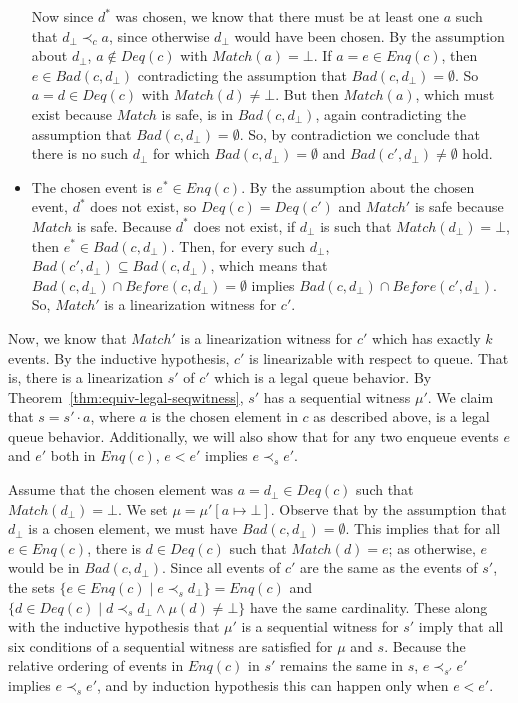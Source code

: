 \documentclass{LMCS}
\newcommand{\Match}{\ensuremath{\mathit{Match}}}
\newcommand{\Deq}[1]{\ensuremath{\mathit{Deq}({#1})}}
\newcommand{\Enq}[1]{\ensuremath{\mathit{Enq}({#1})}}
\newcommand{\Before}[2]{\ensuremath{\mathit{Before}({#1},{#2})}}
\newcommand{\Bad}[2]{\ensuremath{\mathit{Bad}(#1,#2)}}
\newcommand{\dhat}{\ensuremath{d_{\bot}}}
\begin{document}
\begin{itemize}
Now since $d^*$ was chosen, we know that there must be at least one $a$ such that $\dhat\prec_c a$, since otherwise $\dhat$ would have been chosen.
By the assumption about $\dhat$, $a\notin \Deq c$ with $\Match(a)=\bot$.
If $a=e\in \Enq c$, then $e\in \Bad c {\dhat}$ contradicting the assumption that $\Bad c {\dhat}=\emptyset$.
So $a=d\in \Deq c$ with $\Match(d)\neq \bot$.
But then $\Match(a)$, which must exist because $\Match$ is safe, is in $\Bad c {\dhat}$, again contradicting the assumption that $\Bad c {\dhat}=\emptyset$.
So, by contradiction we conclude that there is no such $\dhat$ for which $\Bad c {\dhat}=\emptyset$ and $\Bad {c'} {\dhat}\neq\emptyset$ hold.

\item The chosen event is $e^*\in \Enq c$.
By the assumption about the chosen event, $d^*$ does not exist, so $\Deq c=\Deq {c'}$ and $\Match'$ is safe because $\Match$ is safe.
Because $d^*$ does not exist, if $\dhat$ is such that $\Match(\dhat)=\bot$, then $e^*\in \Bad c {\dhat}$. 
Then, for every such $\dhat$, $\Bad {c'} {\dhat}\subseteq \Bad c {\dhat}$, which means that $\Bad c {\dhat} \cap \Before c {\dhat}=\emptyset$ implies $\Bad c {\dhat} \cap \Before {c'} {\dhat}$. 
So, $\Match'$ is a linearization witness for $c'$.

\end{itemize}

\noindent Now, we know that $\Match'$ is a linearization witness for $c'$ which has exactly $k$ events.
By the inductive hypothesis, $c'$ is linearizable with respect to queue. 
That is, there is a linearization $s'$ of $c'$ which is a legal queue behavior.
By Theorem~\ref{thm:equiv-legal-seqwitness}, $s'$ has a sequential witness $\mu'$.
We claim that $s=s'\cdot a$, where $a$ is the chosen element in $c$ as described above, is a legal queue behavior.
Additionally, we will also show that for any two enqueue events $e$ and $e'$ both in $\Enq c$, $e<e'$ implies $e\prec_s e'$.

Assume that the chosen element was $a=\dhat\in \Deq c$ such that $\Match(\dhat)=\bot$.
We set $\mu=\mu'[a\mapsto \bot]$.
Observe that by the assumption that $\dhat$ is a chosen element, we must have $\Bad c {\dhat}=\emptyset$.
This implies that for all $e\in \Enq c$, there is $d\in \Deq c$ such that $\Match(d)=e$; as otherwise, $e$ would be in $\Bad c {\dhat}$.
Since all events of $c'$ are the same as the events of $s'$, the sets $\{e\in \Enq c \mid e\prec_s \dhat\}=\Enq c$ and $\{d\in \Deq c \mid d\prec_s \dhat \wedge \mu(d)\neq\bot\}$ have the same cardinality.
These along with the inductive hypothesis that $\mu'$ is a sequential witness for $s'$ imply that all six conditions of a sequential witness are satisfied for $\mu$ and $s$.
Because the relative ordering of events in $\Enq c$ in $s'$ remains the same in $s$, $e\prec_{s'} e'$ implies $e\prec_s e'$, and by induction hypothesis this can happen only when $e<e'$.
\end{document}
